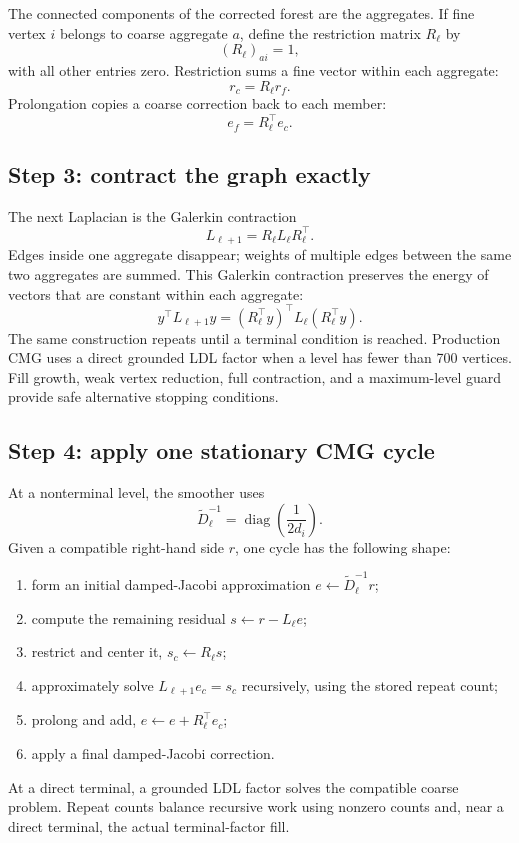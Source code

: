 \documentclass[11pt]{article}
\begin{document}
The connected components of the corrected forest are the aggregates.  If fine vertex $i$ belongs to coarse aggregate $a$, define the restriction matrix $R_\ell$ by
\[
  (R_\ell)_{a i}=1,
\]
with all other entries zero.  Restriction sums a fine vector within each aggregate:
\[
  r_c=R_\ell r_f.
\]
Prolongation copies a coarse correction back to each member:
\[
  e_f=R_\ell^\top e_c.
\]

\subsection{Step 3: contract the graph exactly}

The next Laplacian is the Galerkin contraction
\[
  L_{\ell+1}=R_\ell L_\ell R_\ell^\top.
  \tag{5}\label{eq:galerkin}
\]
Edges inside one aggregate disappear; weights of multiple edges between the same two aggregates are summed.  This Galerkin contraction preserves the energy of vectors that are constant within each aggregate:
\[
  y^\top L_{\ell+1}y=(R_\ell^\top y)^\top L_\ell(R_\ell^\top y).
\]
The same construction repeats until a terminal condition is reached.  Production CMG uses a direct grounded LDL factor when a level has fewer than 700 vertices.  Fill growth, weak vertex reduction, full contraction, and a maximum-level guard provide safe alternative stopping conditions.

\subsection{Step 4: apply one stationary CMG cycle}

At a nonterminal level, the smoother uses
\[
  \widetilde D_\ell^{-1}=\operatorname{diag}\left(\frac{1}{2d_i}\right).
\]
Given a compatible right-hand side $r$, one cycle has the following shape:
\begin{enumerate}
  \item form an initial damped-Jacobi approximation $e\leftarrow \widetilde D_\ell^{-1}r$;
  \item compute the remaining residual $s\leftarrow r-L_\ell e$;
  \item restrict and center it, $s_c\leftarrow R_\ell s$;
  \item approximately solve $L_{\ell+1}e_c=s_c$ recursively, using the stored repeat count;
  \item prolong and add, $e\leftarrow e+R_\ell^\top e_c$;
  \item apply a final damped-Jacobi correction.
\end{enumerate}
At a direct terminal, a grounded LDL factor solves the compatible coarse problem.  Repeat counts balance recursive work using nonzero counts and, near a direct terminal, the actual terminal-factor fill.
\end{document}
